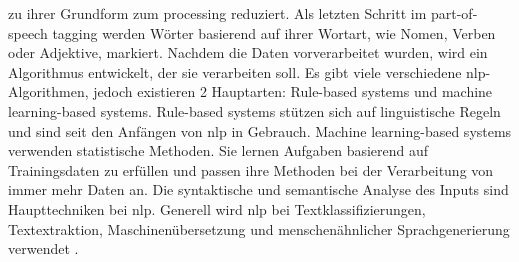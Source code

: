 zu ihrer Grundform zum processing reduziert. Als letzten Schritt im part-of-speech tagging werden Wörter basierend auf ihrer Wortart, wie Nomen, Verben oder Adjektive, markiert. Nachdem die Daten vorverarbeitet wurden, wird ein Algorithmus entwickelt, der sie verarbeiten soll. Es gibt viele verschiedene \gls{nlp}-Algorithmen, jedoch existieren 2 Hauptarten: Rule-based systems und machine learning-based systems. Rule-based systems stützen sich auf linguistische Regeln und sind seit den Anfängen von \gls{nlp} in Gebrauch. Machine learning-based systems verwenden statistische Methoden. Sie lernen Aufgaben basierend auf Trainingsdaten zu erfüllen und passen ihre Methoden bei der Verarbeitung von immer mehr Daten an. Die syntaktische und semantische Analyse des Inputs sind Haupttechniken bei \gls{nlp}. Generell wird \gls{nlp} bei Textklassifizierungen, Textextraktion, Maschinenübersetzung und menschenähnlicher Sprachgenerierung verwendet \cite{nlp-def}. \\
